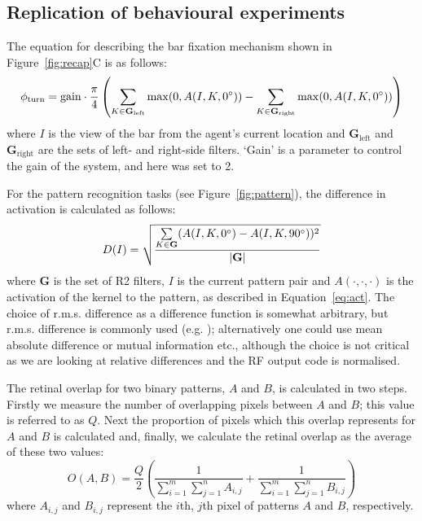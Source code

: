 \subsection*{Replication of behavioural experiments}
\label{sec:methods:replication}
The equation for describing the bar fixation mechanism shown in Figure~\ref{fig:recap}C is as follows:
$$
\phi_\mathrm{turn} = \mathrm{gain}\cdot \frac{\pi}{4}\left( \sum\limits_{K\in \mathbf{G}_\mathrm{left}}\max(0,A(I,K,0\degree)) - \sum\limits_{K\in \mathbf{G}_\mathrm{right}}\max(0,A(I,K,0\degree)) \right)
$$
where $I$ is the view of the bar from the agent's current location and $\mathbf{G}_\mathrm{left}$ and $\mathbf{G}_\mathrm{right}$ are the sets of left- and right-side filters. `Gain' is a parameter to control the gain of the system, and here was set to 2.

For the pattern recognition tasks (see Figure~\ref{fig:pattern}), the difference in activation is calculated as follows:
$$
D(I) = \sqrt{\frac{\sum\limits_{K\in \mathbf{G}}(A(I,K,0\degree)-A(I,K,90\degree))^2}{|\mathbf{G}|}}
$$
where $\mathbf{G}$ is the set of R2 filters, $I$ is the current pattern pair and $A(\cdot,\cdot,\cdot)$ is the activation of the kernel to the pattern, as described in Equation~\ref{eq:act}.
The choice of r.m.s. difference as a difference function is somewhat arbitrary, but r.m.s. difference is commonly used (e.g. \cite{Zeil2003}); alternatively one could use mean absolute difference or mutual information etc., although the choice is not critical as we are looking at relative differences and the RF output code is normalised.

The retinal overlap for two binary patterns, $A$ and $B$, is calculated in two steps. Firstly we measure the number of overlapping pixels between $A$ and $B$; this value is referred to as $Q$. Next the proportion of pixels which this overlap represents for $A$ and $B$ is calculated and, finally, we calculate the retinal overlap as the average of these two values:
$$
O(A,B) = \frac{Q}{2} \left( \frac{1}{\sum\limits_{i=1}^m \sum\limits_{j=1}^n A_{i,j}} + \frac{1}{\sum\limits_{i=1}^m \sum\limits_{j=1}^n B_{i,j}} \right)
$$
where $A_{i,j}$ and $B_{i,j}$ represent the $i$th, $j$th pixel of patterns $A$ and $B$, respectively.

